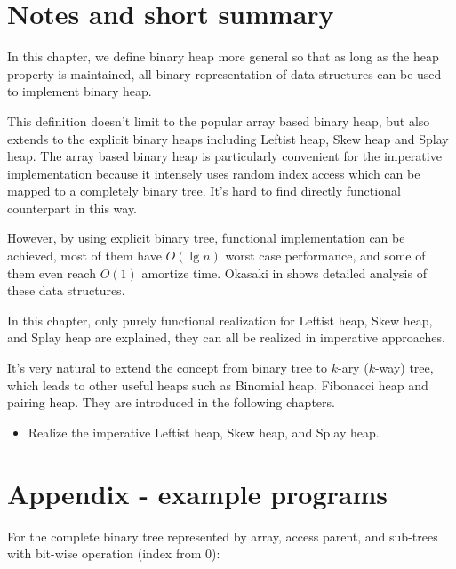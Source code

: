 \documentclass[b5paper]{article}
\begin{document}
\section{Notes and short summary}

In this chapter, we define binary heap more general
so that as long as the heap property is maintained, all binary
representation of data structures can be used to implement binary heap.

This definition doesn't limit to the popular array based binary
heap, but also extends to the explicit binary heaps including Leftist
heap, Skew heap and Splay heap. The array based binary heap
is particularly convenient for the imperative implementation
because it intensely uses random index access which can be mapped to
a completely binary tree. It's hard to find directly functional
counterpart in this way.

However, by using explicit binary tree, functional implementation
can be achieved, most of them have $O(\lg n)$ worst case
performance, and some of them even reach $O(1)$ amortize time.
Okasaki in \cite{okasaki-book} shows detailed analysis of these data
structures.

In this chapter, only purely functional realization for Leftist heap,
Skew heap, and Splay heap are explained, they can all be realized
in imperative approaches.

It's very natural to extend the concept from binary tree to
$k$-ary ($k$-way) tree, which leads to other useful heaps such as
Binomial heap, Fibonacci heap and pairing heap. They are introduced
in the following chapters.

\begin{Exercise}
\begin{itemize}
\item Realize the imperative Leftist heap, Skew heap, and Splay heap.
\end{itemize}
\end{Exercise}

\section{Appendix - example programs}

For the complete binary tree represented by array, access parent, and sub-trees with bit-wise operation (index from 0):
\end{document}
